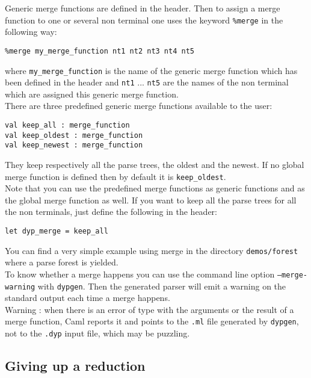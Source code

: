 \documentclass[12pt]{article}
\begin{document}
{Generic merge functions are defined in the header. Then to assign a merge function to one or several non terminal one uses the keyword \texttt{\%merge} in the following way:
\begin{verbatim}
%merge my_merge_function nt1 nt2 nt3 nt4 nt5
\end{verbatim}
where \texttt{my\_merge\_function} is the name of the generic merge function which has been defined in the header and \texttt{nt1} ... \texttt{nt5} are the names of the non terminal which are assigned this generic merge function.\\

There are three predefined generic merge functions available to the user:
\begin{verbatim}
val keep_all : merge_function
val keep_oldest : merge_function
val keep_newest : merge_function
\end{verbatim}
They keep respectively all the parse trees, the oldest and the newest. If no global merge function is defined then by default it is \texttt{keep\_oldest}.\\

Note that you can use the predefined merge functions as generic functions and as the global merge function as well. If you want to keep all the parse trees for all the non terminals, just define the following in the header:
\begin{verbatim}
let dyp_merge = keep_all
\end{verbatim}
You can find a very simple example using merge in the directory \texttt{demos/forest} where a parse forest is yielded.\\

To know whether a merge happens you can use the command line option \texttt{--merge-warning} with \texttt{dypgen}. Then the generated parser will emit a warning on the standard output each time a merge happens.\\

Warning : when there is an error of type with the arguments or the result of a merge function, Caml reports it and points to the \texttt{.ml} file generated by \texttt{dypgen}, not to the \texttt{.dyp} input file, which may be puzzling.\\

\subsection{Giving up a reduction}

}
\end{document}
